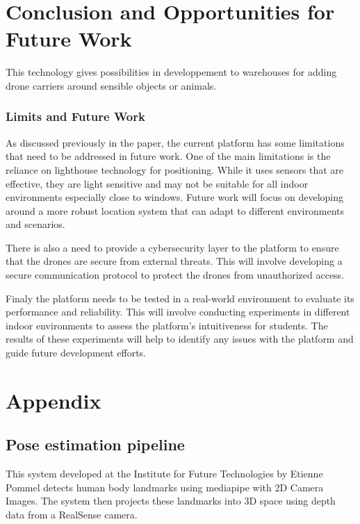\section{Conclusion and Opportunities for Future Work}

This technology gives possibilities in developpement to warehouses for adding drone carriers around sensible objects or animals.

\subsubsection{Limits and Future Work}

As discussed previously in the paper, the current platform has some limitations that need to be addressed in future work. One of the main limitations is the reliance on lighthouse technology \cite{noauthor_dvic_nodate} for positioning. While it uses sensors that are effective, they are light sensitive  and may not be suitable for all indoor environments especially close to windows. Future work will focus on developing around a more robust location system that can adapt to different environments and scenarios.

There is also a need to provide a cybersecurity layer to the platform to ensure that the drones are secure from external threats. This will involve developing a secure communication protocol to protect the drones from unauthorized access.

Finaly the platform needs to be tested in a real-world environment to evaluate its performance and reliability. This will involve conducting experiments in different indoor environments to assess the platform's intuitiveness for students. The results of these experiments will help to identify any issues with the platform and guide future development efforts.

\pagebreak

\section*{Appendix}
\subsection*{Pose estimation pipeline}\label{appendix:additional_work}

This system developed at the Institute for Future Technologies by Etienne Pommel detects human body landmarks using mediapipe\cite{mediapipe2020} with 2D Camera Images. The system then projects these landmarks into 3D space using depth data from a RealSense camera. 

